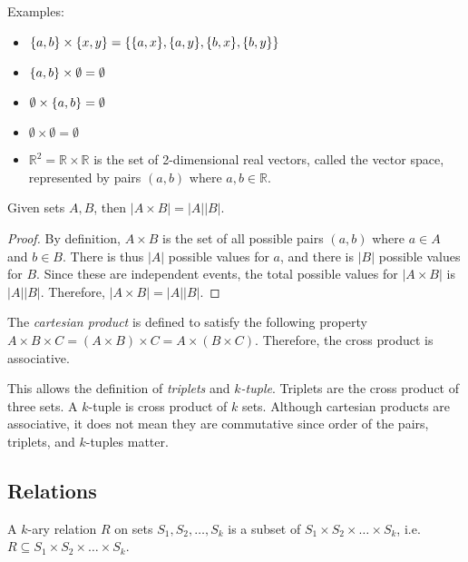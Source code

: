 Examples:
\begin{itemize}
    \item \(\{a,b\}\times\{x,y\}=\{\{a,x\},\{a,y\},\{b,x\},\{b,y\}\}\)
    \item \(\{a,b\}\times\emptyset=\emptyset\)
    \item \(\emptyset\times\{a,b\}=\emptyset\)
    \item \(\emptyset\times\emptyset=\emptyset\)
    \item \(\mathbb{R}^2=\mathbb{R}\times\mathbb{R}\) is the set of 2-dimensional real vectors, called the vector space, represented by pairs \((a,b)\) where 
    \(a,b\in\mathbb{R}\).
\end{itemize}

\bigskip
\begin{proposition}
    Given sets \(A,B\), then \(|A\times B|=|A||B|\).
\end{proposition}
\begin{proof}
    By definition, \(A\times B\) is the set of all possible pairs \((a,b)\) where \(a\in A\) and \(b\in B\). There is thus \(|A|\) possible values for \(a\), and there is
    \(|B|\) possible values for \(B\). Since these are independent events, the total possible values for \(|A\times B|\) is \(|A||B|\). Therefore, \(|A\times B|=|A||B|\).
\end{proof}

\bigskip
\begin{definition}
    The \emph{cartesian product} is defined to satisfy the following property \(A\times B\times C=(A\times B)\times C=A\times(B\times C)\). Therefore, the cross product is 
    associative. 
\end{definition}

This allows the definition of \emph{triplets} and \emph{\(k\)-tuple}. Triplets are the cross product of three sets. A \(k\)-tuple is cross product of \(k\) sets. Although cartesian products
are associative, it does not mean they are commutative since order of the pairs, triplets, and \(k\)-tuples matter. 

\subsection{Relations}

\begin{definition}
    A \(k\)-ary relation \(R\) on sets \(S_1,S_2,\dots,S_k\) is a subset of \(S_1\times S_2\times\dots\times S_k\), i.e.\ \(R\subseteq S_1\times S_2\times\dots\times S_k\).
\end{definition}


